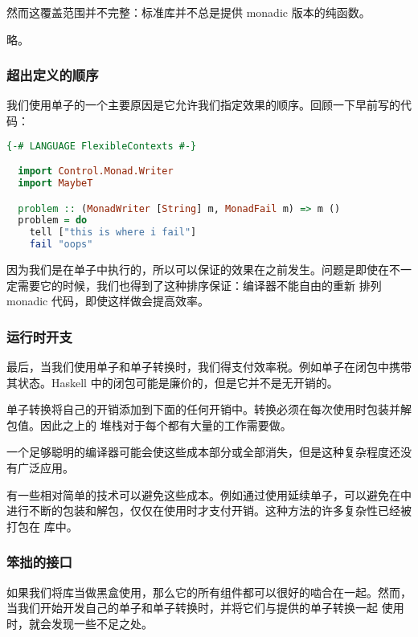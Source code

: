 \documentclass[./main.tex]{subfiles}
\begin{document}
然而这覆盖范围并不完整：标准库并不总是提供 monadic 版本的纯函数。

略。

\subsubsection*{超出定义的顺序}

我们使用单子的一个主要原因是它允许我们指定效果的顺序。回顾一下早前写的代码：

\begin{lstlisting}[language=Haskell]
  {-# LANGUAGE FlexibleContexts #-}

  import Control.Monad.Writer
  import MaybeT

  problem :: (MonadWriter [String] m, MonadFail m) => m ()
  problem = do
    tell ["this is where i fail"]
    fail "oops"
\end{lstlisting}

因为我们是在单子中执行的，所以可以保证的效果在之前发生。问题是即使在不一定需要它的时候，我们也得到了这种排序保证：编译器不能自由的重新
排列 monadic 代码，即使这样做会提高效率。

\subsubsection*{运行时开支}

最后，当我们使用单子和单子转换时，我们得支付效率税。例如单子在闭包中携带其状态。Haskell 中的闭包可能是廉价的，但是它并不是无开销的。

单子转换将自己的开销添加到下面的任何开销中。转换必须在每次使用\acode{(>>=)}时包装并解包值。因此之上的
堆栈对于每个\acode{(>>=)}都有大量的工作需要做。

一个足够聪明的编译器可能会使这些成本部分或全部消失，但是这种复杂程度还没有广泛应用。

有一些相对简单的技术可以避免这些成本。例如通过使用延续单子，可以避免在\acode{(>>=)}中进行不断的包装和解包，仅仅在使用时才支付开销。这种方法的许多复杂性已经被打包在
库中。

\subsubsection*{笨拙的接口}

如果我们将库当做黑盒使用，那么它的所有组件都可以很好的啮合在一起。然而，当我们开始开发自己的单子和单子转换时，并将它们与提供的单子转换一起
使用时，就会发现一些不足之处。
\end{document}
